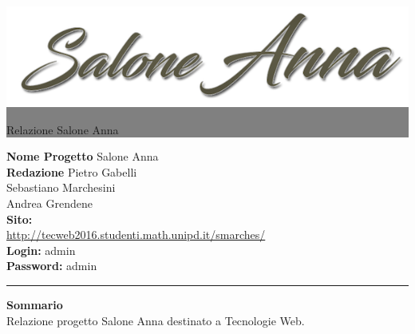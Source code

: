 \documentclass[12pt,a4paper,titlepage]{article}
\newcommand{\HRule}[1]{\hfill \rule{0.2\linewidth}{#1}} %
\begin{document}
	
	\thispagestyle{empty} %
	
	
	\colorbox{grey}{
		\parbox[t]{0.91\linewidth}{
			\centering \fontsize{50pt}{80pt}\selectfont %
			\vspace*{0.7cm} %
			
			
			\raggedleft
			\includegraphics[width=\linewidth]{../public_html/img/logo.png}
			
			\hfill Relazione Salone Anna \\
			
			\vspace*{0.7cm} %
		}
	}
	
	
	\vfill %
	
	
	{\centering \large 
		\hfill \textbf{Nome Progetto} Salone Anna \\
		\hfill \textbf{Redazione} 	Pietro Gabelli \\
		\hfill 						Sebastiano Marchesini \\
		\hfill						Andrea Grendene \\
		
		\vspace{1cm}
		\textbf{Sito:} \\
		\url{http://tecweb2016.studenti.math.unipd.it/smarches/} \\
		\vspace{1cm}
		\textbf{Login:} admin \\
		\textbf{Password:} admin \\
		
		\HRule{1pt}
		
		\textbf{Sommario} \\
		Relazione progetto Salone Anna destinato a Tecnologie Web.
		
	} %
	
\end{document}
